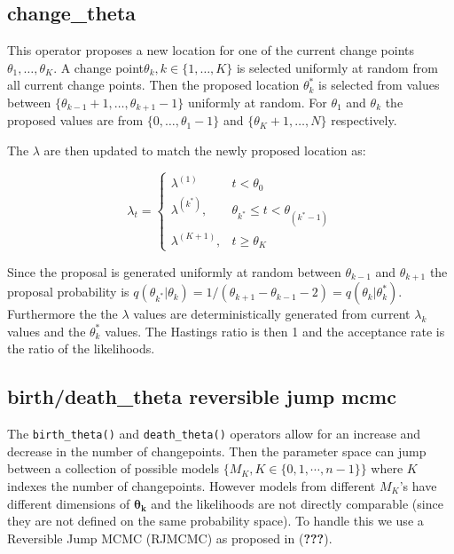 \documentclass[]{article}
\numberwithin{equation}{section}
\begin{document}
\hypertarget{change_theta}{%
\subsection{change\_theta}\label{change_theta}}

This operator proposes a new location for one of the current change
points \(\theta_1,\dots, \theta_K\). A change
point\(\theta_k, k \in \{1, \dots, K\}\) is selected uniformly at random
from all current change points. Then the proposed location
\(\theta_k^*\) is selected from values between
\(\{\theta_{k-1}+1,\dots, \theta_{k+1}-1\}\) uniformly at random. For
\(\theta_1\) and \(\theta_k\) the proposed values are from
\(\{0,\dots, \theta_1-1\}\) and \(\{\theta_K+1,\dots, N\}\)
respectively.

The \(\lambda\) are then updated to match the newly proposed location
as:

\[ \lambda_t =  \begin{cases} \lambda^{(1)} & t < \theta_0 \\
\lambda^{(k^*)}, & \theta_{k^*} \leq t < \theta_{(k^*-1)} \\
\lambda^{(K+1)}, & t \geq \theta_K \end{cases}\]

Since the proposal is generated uniformly at random between
\(\theta_{k-1}\) and \(\theta_{k+1}\) the proposal probability is
\(q(\theta_{k^*}|\theta_k) = 1/(\theta_{k+1}-\theta_{k-1}-2) = q(\theta_k|\theta_k^*)\).
Furthermore the the \(\lambda\) values are deterministically generated
from current \(\lambda_k\) values and the \(\theta_k^*\) values. The
Hastings ratio is then 1 and the acceptance rate is the ratio of the
likelihoods.

\hypertarget{birthdeath_theta-reversible-jump-mcmc}{%
\subsection{birth/death\_theta reversible jump
mcmc}\label{birthdeath_theta-reversible-jump-mcmc}}

The \texttt{birth\_theta()} and \texttt{death\_theta()} operators allow
for an increase and decrease in the number of changepoints. Then the
parameter space can jump between a collection of possible models
\(\{M_K, K \in \{0,1,\cdots,n-1\}\}\) where \(K\) indexes the number of
changepoints. However models from different \(M_K\)'s have different
dimensions of \(\boldsymbol{\theta_k}\) and the likelihoods are not
directly comparable (since they are not defined on the same probability
space). To handle this we use a Reversible Jump MCMC (RJMCMC) as
proposed in ({\textbf{???}}).
\end{document}

